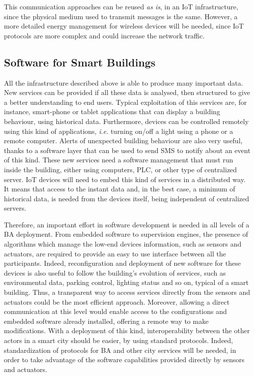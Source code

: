 This communication approaches can be reused \textit{as is}, in an IoT infrastructure, since the physical medium used to transmit messages is the same.
However, a more detailed energy management for wireless devices will be needed, since IoT protocols are more complex and could increase the network traffic.

\subsection{Software for Smart Buildings}
All the infrastructure described above is able to produce many important data.
New services can be provided if all these data is analysed, then structured to give a better understanding to end users.
Typical exploitation of this services are, for instance, smart-phone or tablet applications that can display a building behaviour, using historical data.
Furthermore, devices can be controlled remotely using this kind of applications, \textit{i.e.} turning on/off a light using a phone or a remote computer.
Alerts of unexpected building behaviour are also very useful, thanks to a software layer that can be used to send SMS to notify about an event of this kind.
These new services need a software management that must run inside the building, either using computers, PLC, or other type of centralized server.
IoT devices will need to embed this kind of services in a distributed way.
It means that access to the instant data and, in the best case, a minimum of historical data, is needed from the devices itself, being independent of centralized servers.

Therefore, an important effort in software development is needed in all levels of a BA deployment.
From embedded software to supervision engines, the presence of algorithms which manage the low-end devices information, such as sensors and actuators, are required to provide an easy to use interface between all the participants.
Indeed, reconfiguration and deployment of new software for these devices is also useful to follow the building's evolution of services, such as environmental data, parking control, lighting status and so on, typical of a smart building.
Thus, a transparent way to access services directly from the sensors and actuators could be the most efficient approach.
Moreover, allowing a direct communication at this level would enable access to the configurations and embedded software already installed, offering a remote way to make modifications.
With a deployment of this kind, interoperability between the other actors in a smart city should be easier, by using standard protocols.
Indeed, standardization of protocols for BA and other city services will be needed, in order to take advantage of the software capabilities provided directly by sensors and actuators.

